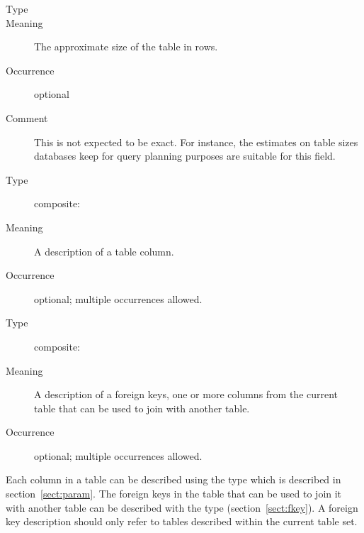 \documentclass[11pt,a4paper]{ivoa}
\begin{document}
\begin{generated}
\begin{bigdescription}
\begin{description}
\end{description}
\item[Element \xmlel{nrows}]
\begin{description}
\item[Type] 
\item[Meaning] The approximate size of the table in rows.
\item[Occurrence] optional
\item[Comment] This is not expected to be exact.  For instance, the
                  estimates on table sizes databases keep for query
                  planning purposes are suitable for this field.

\end{description}
\item[Element \xmlel{column}]
\begin{description}
\item[Type] composite: 
\item[Meaning] A description of a table column.
\item[Occurrence] optional; multiple occurrences allowed.

\end{description}
\item[Element \xmlel{foreignKey}]
\begin{description}
\item[Type] composite: 
\item[Meaning] A description of a foreign keys, one or more columns
                  from the current table that can be used to join with
                  another table.
\item[Occurrence] optional; multiple occurrences allowed.

\end{description}


\end{bigdescription}\endgroup

\endgroup
\end{generated}





Each column in a table can be described using the
 type which is described in
section~\ref{sect:param}.  The foreign keys in the table that
can be used to join it with another table can be described with the
 type (section~\ref{sect:fkey}).
A foreign key description should only refer to tables described within
the current table set.
\end{document}
